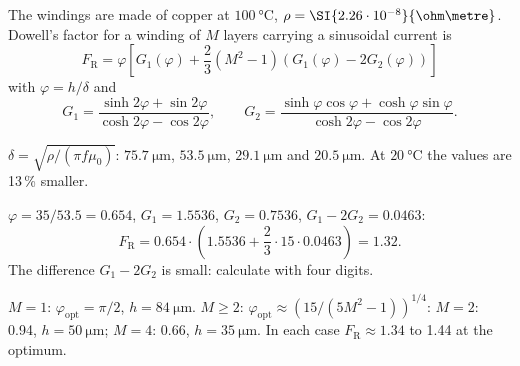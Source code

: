 


The windings are made of copper at $\SI{100}{\celsius}$, $\rho=\SI{2.26\cdot10^{-8}}{\ohm\metre}$. Dowell's factor for a winding of $M$ layers carrying a sinusoidal current is
\begin{equation}
	F_\mathrm{R}=\varphi\left[G_1(\varphi)+\frac{2}{3}\left(M^2-1\right)\left(G_1(\varphi)-2G_2(\varphi)\right)\right]
\end{equation}
with $\varphi=h/\delta$ and
\begin{equation}
	G_1=\frac{\sinh2\varphi+\sin2\varphi}{\cosh2\varphi-\cos2\varphi},\qquad G_2=\frac{\sinh\varphi\cos\varphi+\cosh\varphi\sin\varphi}{\cosh2\varphi-\cos2\varphi}.
\end{equation}


\begin{solutionblock}
	$\delta=\sqrt{\rho/(\pi f\mu_0)}$: $\SI{75.7}{\micro\metre}$, $\SI{53.5}{\micro\metre}$, $\SI{29.1}{\micro\metre}$ and $\SI{20.5}{\micro\metre}$. At $\SI{20}{\celsius}$ the values are 13\,\% smaller.
\end{solutionblock}


\begin{solutionblock}
	$\varphi=35/53.5=0.654$, $G_1=1.5536$, $G_2=0.7536$, $G_1-2G_2=0.0463$:
	\begin{equation}
		F_\mathrm{R}=0.654\cdot\left(1.5536+\frac{2}{3}\cdot15\cdot0.0463\right)=1.32.
	\end{equation}
	The difference $G_1-2G_2$ is small: calculate with four digits.
\end{solutionblock}


\begin{solutionblock}
	$M=1$: $\varphi_\mathrm{opt}=\pi/2$, $h=\SI{84}{\micro\metre}$. $M\geq2$: $\varphi_\mathrm{opt}\approx(15/(5M^2-1))^{1/4}$: $M=2$: 0.94, $h=\SI{50}{\micro\metre}$; $M=4$: 0.66, $h=\SI{35}{\micro\metre}$. In each case $F_\mathrm{R}\approx1.34$ to 1.44 at the optimum.
\end{solutionblock}

